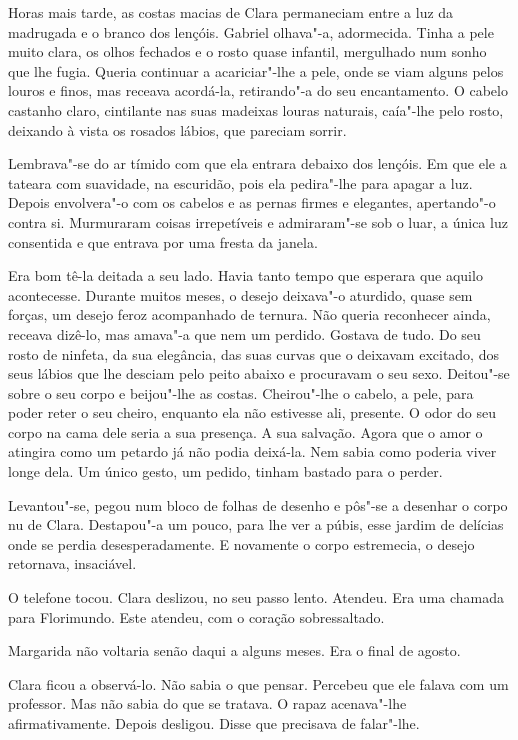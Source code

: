 Horas mais tarde, as costas macias de Clara permaneciam entre a luz da
madrugada e o branco dos lençóis. Gabriel olhava"-a, adormecida. Tinha a
pele muito clara, os olhos fechados e o rosto quase infantil, mergulhado
num sonho que lhe fugia. Queria continuar a acariciar"-lhe a pele, onde
se viam alguns pelos louros e finos, mas receava acordá-la, retirando"-a
do seu encantamento. O cabelo castanho claro, cintilante nas suas
madeixas louras naturais, caía"-lhe pelo rosto, deixando à vista os
rosados lábios, que pareciam sorrir.

Lembrava"-se do ar tímido com que ela entrara debaixo dos lençóis. Em que
ele a tateara com suavidade, na escuridão, pois ela pedira"-lhe para
apagar a luz. Depois envolvera"-o com os cabelos e as pernas firmes e
elegantes, apertando"-o contra si. Murmuraram coisas irrepetíveis e
admiraram"-se sob o luar, a única luz consentida e que entrava por uma
fresta da janela.

Era bom tê-la deitada a seu lado. Havia tanto tempo que esperara que
aquilo acontecesse. Durante muitos meses, o desejo deixava"-o aturdido,
quase sem forças, um desejo feroz acompanhado de ternura. Não queria
reconhecer ainda, receava dizê-lo, mas amava"-a que nem um perdido.
Gostava de tudo. Do seu rosto de ninfeta, da sua elegância, das suas
curvas que o deixavam excitado, dos seus lábios que lhe desciam pelo
peito abaixo e procuravam o seu sexo. Deitou"-se sobre o seu corpo e
beijou"-lhe as costas. Cheirou"-lhe o cabelo, a pele, para poder reter o
seu cheiro, enquanto ela não estivesse ali, presente. O odor do seu
corpo na cama dele seria a sua presença. A sua salvação. Agora que o
amor o atingira como um petardo já não podia deixá-la. Nem sabia como
poderia viver longe dela. Um único gesto, um pedido, tinham bastado para
o perder.

Levantou"-se, pegou num bloco de folhas de desenho e pôs"-se a desenhar o
corpo nu de Clara. Destapou"-a um pouco, para lhe ver a púbis, esse
jardim de delícias onde se perdia desesperadamente. E novamente o corpo
estremecia, o desejo retornava, insaciável.

O telefone tocou. Clara deslizou, no seu passo lento. Atendeu. Era uma
chamada para Florimundo. Este atendeu, com o coração sobressaltado.

Margarida não voltaria senão daqui a alguns meses. Era o final de
agosto.

Clara ficou a observá-lo. Não sabia o que pensar. Percebeu que ele
falava com um professor. Mas não sabia do que se tratava. O rapaz
acenava"-lhe afirmativamente. Depois desligou. Disse que precisava de
falar"-lhe.

